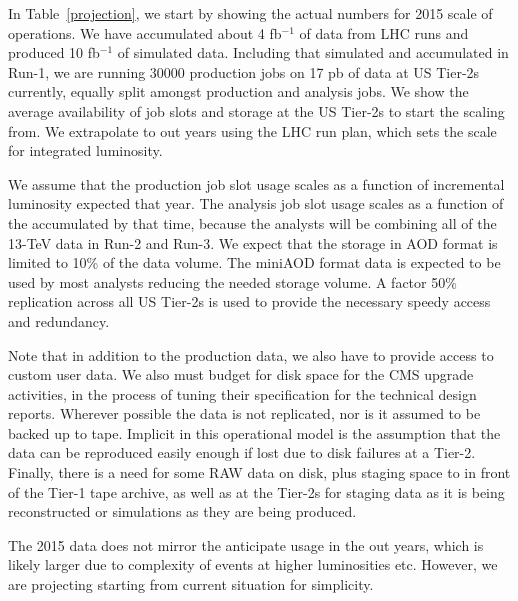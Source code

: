 \documentclass[11pt,a4paper]{article}
\begin{document}
In Table~\ref{projection}, we start by showing the actual numbers for
2015 scale of operations.  We have accumulated about 4 fb$^{-1}$
of data from LHC runs and produced 10 fb$^{-1}$ of simulated data.
Including that simulated and accumulated in Run-1, we are running
30000 production jobs on 17 pb of data at US Tier-2s currently,
equally split amongst production and analysis jobs.  We show the
average availability of job slots and storage at the US Tier-2s to
start the scaling from.  We extrapolate to out years using the
LHC run plan, which sets the scale for integrated luminosity.

We assume that the production job slot usage scales as a function of 
incremental luminosity expected that year.  The analysis job slot usage
scales as a function of the accumulated by that time, because the analysts
will be combining all of the 13-TeV data in Run-2 and Run-3.
We expect that the storage in AOD format is limited to 10\% of
the data volume.  The miniAOD format data is expected to be
used by most analysts reducing the needed storage volume.  A
factor 50\% replication across all US Tier-2s is used to provide 
the necessary speedy access and redundancy.

Note that in addition to the production data, we also have to provide
access to custom user data.  We also must budget for disk space for 
the CMS upgrade activities, in the process of tuning their specification
for the technical design reports.  Wherever possible the data is not replicated, 
nor is it assumed to be  backed up to tape. Implicit in this operational model 
is the assumption that the data can be reproduced easily enough if lost due 
to disk failures at a Tier-2.  Finally, there is a need for some RAW data on disk, 
plus staging space to in front of the Tier-1 tape archive, as well as at the Tier-2s
for staging data as it is being reconstructed or simulations as they are being 
produced. 

The 2015 data does not mirror the anticipate usage in the out years,
which is likely larger due to complexity of events at higher luminosities
etc.  However, we are projecting starting from current situation for
simplicity.
\end{document}
